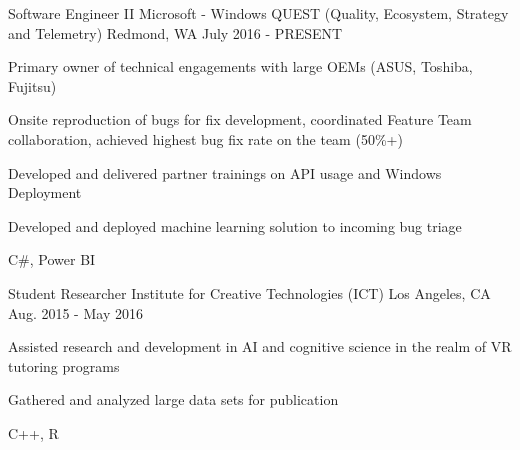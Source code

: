 

\begin{cventries}

  \cventry
    {Software Engineer II} %
    {Microsoft - Windows QUEST (Quality, Ecosystem, Strategy and Telemetry)} %
    {Redmond, WA} %
    {July 2016 - PRESENT} %
    {
      \begin{cvitems} %
        \item {Primary owner of technical engagements with large OEMs (ASUS, Toshiba, Fujitsu)}
        \item {Onsite reproduction of bugs for fix development, coordinated Feature Team collaboration, achieved highest bug fix rate on the team (50\%+)}
        \item {Developed and delivered partner trainings on API usage and Windows Deployment}
        \item {Developed and deployed machine learning solution to incoming bug triage}
        \item {C\#, Power BI}
      \end{cvitems}
    }
    \linebreak
  \cventry
    {Student Researcher} %
    {Institute for Creative Technologies (ICT)} %
    {Los Angeles, CA} %
    {Aug. 2015 - May 2016} %
    {
      \begin{cvitems} %
        \item {Assisted research and development in AI and cognitive science in the realm of VR tutoring programs}
        \item {Gathered and analyzed large data sets for publication}
        \item {C++, R}
      \end{cvitems}
    }
    \linebreak
    

\end{cventries}

